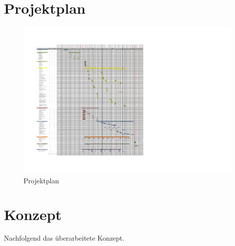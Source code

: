 \newpage
\chapter{Projektplan}
\begin{figure}[H]
\includegraphics[width=.9\textwidth]{./images/projektplan_neu.pdf}
\caption{Projektplan}
\label{fig:projektplan}
\end{figure}

 \newpage
\chapter{Konzept}
 Nachfolgend das überarbeitete Konzept.
 


